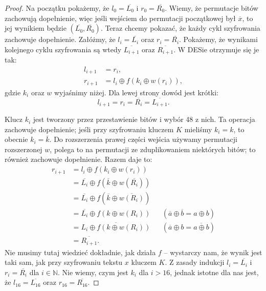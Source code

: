 \documentclass{article}
\newcommand{\xor}{\oplus}
\renewcommand{\c}{\overline}
\begin{document}
\begin{proof}
    Na początku pokażemy, że $l_0 = \c{L_0}$ i $r_0 = \c{R_0}$.
    Wiemy, że permutacje bitów zachowują dopełnienie,
    więc jeśli wejściem do permutacji początkowej był $\c x$,
    to jej wynikiem będzie $(\c{L_0}, \c{R_0})$.
    Teraz chcemy pokazać, że każdy cykl szyfrowania zachowuje dopełnienie.
    Załóżmy, że $l_i = \c{L_i}$ oraz $r_i = \c{R_i}$.
    Pokażemy, że wynikami kolejnego cyklu szyfrowania są wtedy $\c{L_{i + 1}}$ oraz $\c{R_{i + 1}}$.
    W DESie otrzymuje się je tak:
    \begin{align*}
        l_{i + 1} &= r_i, \\
        r_{i + 1} &= l_i \xor f(k_i \xor w(r_i)),
    \end{align*}
    gdzie $k_i$ oraz $w$ wyjaśnimy niżej. Dla lewej strony dowód jest krótki:
    \[
        l_{i + 1} = r_i = \c{R_i} = \c{L_{i + 1}}.
    \]
    
    Klucz $k_i$ jest tworzony przez przestawienie bitów i wybór 48 z nich.
    Ta operacja zachowuje dopełnienie;
    jeśli przy szyfrowaniu kluczem $K$ mieliśmy $k_i = k$, to obecnie $k_i = \c k$.
    Do rozszerzenia prawej części wejścia używamy permutacji rozszerzonej $w$,
    polega to na permutacji ze zduplikowaniem niektórych bitów;
    to również zachowuje dopełnienie. Razem daje to:
    \begin{align*}
        r_{i + 1} &= l_i \xor f(k_i \xor w(r_i)) \\
            &= \c{L_i} \xor f(\c k \xor w(\c{R_i})) \\
            &= \c{L_i} \xor f(\c k \xor \c{w(R_i)}) \\
            &= \c{L_i} \xor f(k \xor w(R_i)) && (\c a \xor \c b = a \xor b) \\
            &= \c{L_i \xor f(k \xor w(R_i))} && (\c a \xor b = \c{a \xor b}) \\
            &= \c{R_{i + 1}}.
    \end{align*}
    Nie musimy tutaj wiedzieć dokładnie, jak działa $f$ --
    wystarczy nam, że wynik jest taki sam,
    jak przy szyfrowaniu tekstu $x$ kluczem $K$.
    Z zasady indukcji $l_i = \c{L_i}$ i $r_i = \c{R_i}$ dla $i \in \mathbb{N}$.
    Nie wiemy, czym jest $k_i$ dla $i > 16$,
    jednak istotne dla nas jest,
    że $l_{16} = \c{L_{16}}$ oraz $r_{16} = \c{R_{16}}$.
\end{proof}
\end{document}

